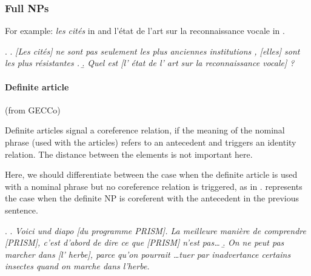 \documentclass[a4paper]{article}
\begin{document}
\subsubsection{Full NPs}

For example: {\sl les cités} in \Next[a] and {l'état de l'art sur la
reconnaissance vocale} in \Next[b].

\ex.
\a.
\textsl{[Les cités] ne sont pas seulement les plus anciennes institutions ,
[elles] sont les plus résistantes .}
\b.
\textsl{Quel est [l' état de l' art sur la reconnaissance vocale] ?}


\paragraph*{Definite article}
(from GECCo)

Definite articles signal a coreference relation, if the meaning of the nominal
phrase (used with the articles) refers to an antecedent and triggers an identity
relation. The distance between the elements is not important here.

Here, we should differentiate between the case when the definite article is used
with a nominal phrase but no coreference relation is triggered, as in \Next[b].
\Next[a] represents the case when the definite NP is coreferent with the
antecedent in the previous sentence.

\ex.
\a.
\textsl{Voici und diapo [du programme PRISM]. La meilleure manière de
comprendre [PRISM], c'est d'abord de dire ce que [PRISM] n'est pas\ldots}
\b.
\textsl{On ne peut pas marcher dans [l' herbe], parce qu'on pourrait \ldots tuer
par inadvertance certains insectes quand on marche dans l'herbe.}
\end{document}
